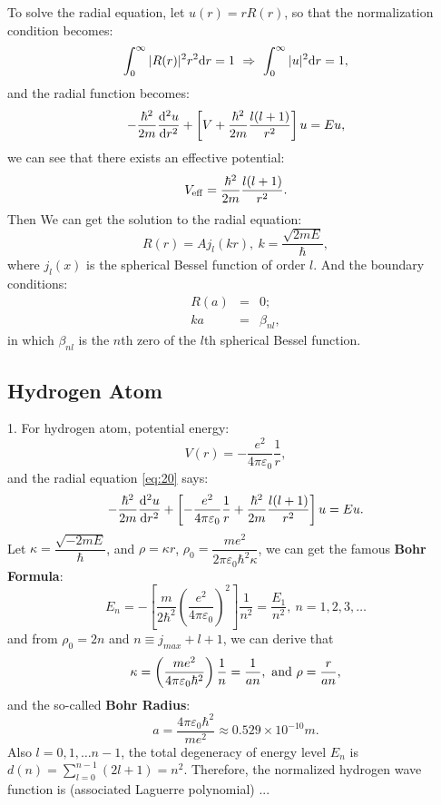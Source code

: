 \documentclass[12pt, 
]{article}
\begin{document}
To solve the radial equation, let $u(r)=rR(r)$, so that the normalization condition becomes:
\[
	\int_0^\infty|R(r)|^2 r^2{\rm d}r=1~\Rightarrow~\int_0^\infty|u|^2{\rm d}r=1
,\]
and the radial function becomes:
\begin{equation}\label{eq:20}
	-\frac{\hbar^2}{2m}\frac{{\rm d}^2u}{{\rm d}r^2}+\left[V+\frac{\hbar^2}{2m}\frac{l(l+1)}{r^2}\right]u=Eu,
\end{equation}
we can see that there exists an effective potential:
\[
	V_{\rm eff}=\frac{\hbar^2}{2m}\frac{l(l+1)}{r^2}.
\]
Then We can get the solution to the radial equation:
\[
	R(r)=Aj_l(kr),~k=\frac{\sqrt{2mE}}{\hbar},
\]
where $j_l(x)$ is the spherical Bessel function of order $l$. And the boundary conditions:
\begin{eqnarray*}
	R(a)&=&0;\\
	ka&=&\beta_{nl},
\end{eqnarray*}
in which $\beta_{nl}$ is the $n$th zero of the $l$th spherical Bessel function.

\subsection{Hydrogen Atom}
1. For hydrogen atom, potential energy:
\[
	V(r)=-\frac{e^2}{4\pi\varepsilon_0}\frac{1}{r},
\]
and the radial equation \ref{eq:20} says:
\[
	-\frac{\hbar^2}{2m}\frac{{\rm d}^2 u}{{\rm d}r^2}+\left[-\frac{e^2}{4\pi\varepsilon_0}\frac{1}{r}+\frac{\hbar^2}{2m}\frac{l(l+1)}{r^2}\right]u=Eu.
\]
Let $\kappa=\dfrac{\sqrt{-2mE}}{\hbar}$, and $\rho=\kappa r$, $\rho_0=\dfrac{me^2}{2\pi\varepsilon_0\hbar^2\kappa}$, we can get the famous {\bf Bohr Formula}:
\begin{equation}
	E_n=-\left[\frac{m}{2\hbar^2}\left(\frac{e^2}{4\pi\varepsilon_0}\right)^2\right]\frac{1}{n^2}=\frac{E_1}{n^2},~n=1,2,3,\dots
\end{equation}
and from $\rho_0=2n$ and $n\equiv j_{max}+l+1$, we can derive that
\[
	\kappa=\left(\frac{me^2}{4\pi\varepsilon_0\hbar^2}\right)\frac{1}{n}=\frac{1}{an}, ~{\rm and}~\rho=\frac{r}{an},
\]
and the so-called {\bf Bohr Radius}:
\[
	a=\frac{4\pi\varepsilon_0\hbar^2}{me^2}\approx 0.529\times10^{-10}m.
\]
Also $l=0,1,\dots n-1$, the total degeneracy of energy level $E_n$ is $\displaystyle d(n)=\sum_{l=0}^{n-1}(2l+1)=n^2$. Therefore, the normalized hydrogen wave function is (associated Laguerre polynomial) ...
~\\
\end{document}
